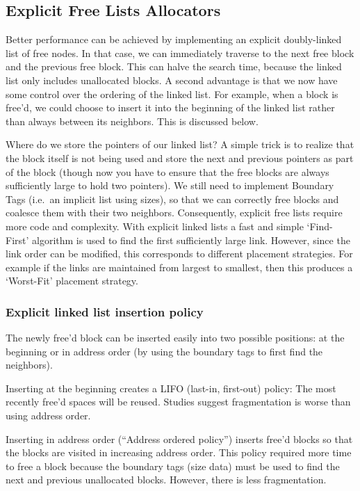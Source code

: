 \subsection{Explicit Free Lists Allocators}

Better performance can be achieved by implementing an explicit doubly-linked list of free nodes. In that case, we can immediately traverse to the next free block and the previous free block. This can halve the search time, because the linked list only includes unallocated blocks. A second advantage is that we now have some control over the ordering of the linked list. For example, when a block is free'd, we could choose to insert it into the beginning of the linked list rather than always between its neighbors. This is discussed below.

Where do we store the pointers of our linked list? A simple trick is to realize that the block itself is not being used and store the next and previous pointers as part of the block (though now you have to ensure that the free blocks are always sufficiently large to hold two pointers). We still need to implement Boundary Tags (i.e.~an implicit list using sizes), so that we can correctly free blocks and coalesce them with their two neighbors. Consequently, explicit free lists require more code and complexity. With explicit linked lists a fast and simple `Find-First' algorithm is used to find the first sufficiently large link. However, since the link order can be modified, this corresponds to different placement strategies. For example if the links are maintained from largest to smallest, then this produces a `Worst-Fit' placement strategy.

\subsubsection{Explicit linked list insertion policy}

The newly free'd block can be inserted easily into two possible positions: at the beginning or in address order (by using the boundary tags to first find the neighbors).

Inserting at the beginning creates a LIFO (last-in, first-out) policy: The most recently free'd spaces will be reused. Studies suggest fragmentation is worse than using address order.

Inserting in address order (``Address ordered policy'') inserts free'd blocks so that the blocks are visited in increasing address order. This policy required more time to free a block because the boundary tags (size data) must be used to find the next and previous unallocated blocks. However, there is less fragmentation.

